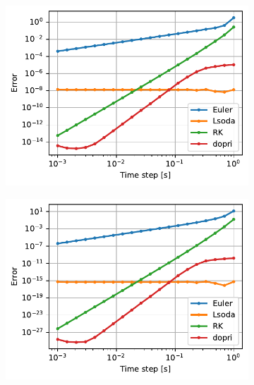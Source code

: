 \documentclass{cmc}
\begin{document}
\begin{figure}[H]
  \centering
  \begin{subfigure}[b]{0.49\textwidth}
    \centering \includegraphics[width=1.0\textwidth]{figures/L1}
    \caption{\label{fig:ode-err-1}}
  \end{subfigure}
  \begin{subfigure}[b]{0.49\textwidth}
    \centering \includegraphics[width=1.0\textwidth]{figures/L2}
    \caption{\label{fig:ode-err-2}}
  \end{subfigure}
  \begin{subfigure}[b]{0.49\textwidth}

\end{subfigure}
\end{figure}
\end{document}
